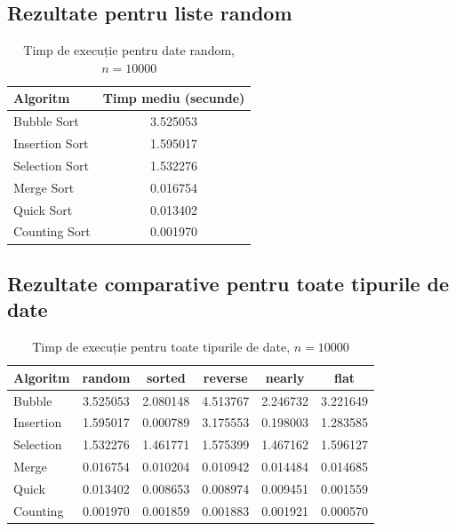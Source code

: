 \documentclass[a4paper,12pt]{article}
\begin{document}
\subsection{Rezultate pentru liste random}

\begin{table}[H]
\centering
\caption{Timp de execuție pentru date random, $n=10000$}
\label{tab:random10000}
\begin{tabular}{lc}
\toprule
\textbf{Algoritm} & \textbf{Timp mediu (secunde)} \\
\midrule
Bubble Sort    & 3.525053 \\
Insertion Sort & 1.595017 \\
Selection Sort & 1.532276 \\
Merge Sort     & 0.016754 \\
Quick Sort     & 0.013402 \\
Counting Sort  & 0.001970 \\
\bottomrule
\end{tabular}
\end{table}

\subsection{Rezultate comparative pentru toate tipurile de date}

\begin{table}[H]
\centering
\caption{Timp de execuție pentru toate tipurile de date, $n=10000$}
\label{tab:toate10000}
\begin{tabular}{lccccc}
\toprule
\textbf{Algoritm} & \textbf{random} & \textbf{sorted} & \textbf{reverse} & \textbf{nearly} & \textbf{flat} \\
\midrule
Bubble    & 3.525053 & 2.080148 & 4.513767 & 2.246732 & 3.221649 \\
Insertion & 1.595017 & 0.000789 & 3.175553 & 0.198003 & 1.283585 \\
Selection & 1.532276 & 1.461771 & 1.575399 & 1.467162 & 1.596127 \\
Merge     & 0.016754 & 0.010204 & 0.010942 & 0.014484 & 0.014685 \\
Quick     & 0.013402 & 0.008653 & 0.008974 & 0.009451 & 0.001559 \\
Counting  & 0.001970 & 0.001859 & 0.001883 & 0.001921 & 0.000570 \\
\bottomrule
\end{tabular}
\end{table}
\end{document}
